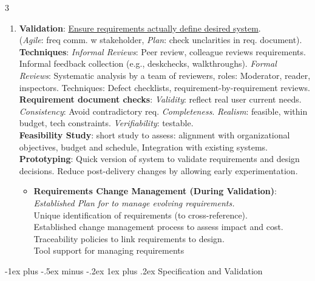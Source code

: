 \documentclass[a4paper, 10pt, landscape]{article}
\makeatletter
\renewcommand{\subsubsection}{\@startsection{subsubsection}{3}{0mm}%
                                {-1ex plus -.5ex minus -.2ex}%
                                {1ex plus .2ex}%
                                {\normalfont\small\bfseries}}
\makeatother
\begin{document}
\begin{multicols*}{3}
\begin{enumerate}[leftmargin=2mm,labelindent=1mm,labelsep=1mm, itemsep = 0.5pt, before=\justifying]
\begin{itemize}
\end{itemize}
    \item \textbf{Validation}: \underline{Ensure requirements actually define desired system}. \\
     (\textit{Agile}: freq comm. w stakeholder, \textit{Plan}: check unclarities in req. document). \textbf{Techniques}: \textit{Informal Reviews}: Peer review, colleague reviews requirements. Informal feedback collection (e.g., deskchecks, walkthroughs). \textit{Formal Reviews}: Systematic analysis by a team of reviewers, roles: Moderator, reader, inspectors. Techniques: Defect checklists, requirement-by-requirement reviews. \\
      \textbf{Requirement document checks}: \textit{Validity}: reflect real user current needs. \textit{Consistency}: Avoid contradictory req. \textit{Completeness}.  \textit{Realism}: feasible, within budget, tech constraints. \textit{Verifiability}: testable. \\
	    \textbf{Feasibility Study}: short study to assess: alignment with organizational objectives, budget and schedule, Integration with existing systems. \\
	    \textbf{Prototyping}: Quick version of system to validate requirements and design decisions. Reduce post-delivery changes by allowing early experimentation.
	    \begin{itemize}
\item \textbf{Requirements Change Management (During Validation)}: \\
    \textit{Established Plan for to manage evolving requirements.} \\
    Unique identification of requirements (to cross-reference). \\
    Established change management process to assess impact and cost. \\
    Traceability policies to link requirements to design. \\
    Tool support for managing requirements
\end{itemize}
\end{enumerate}	    

\subsubsection{Specification and Validation}


\end{multicols*}
\end{document}
